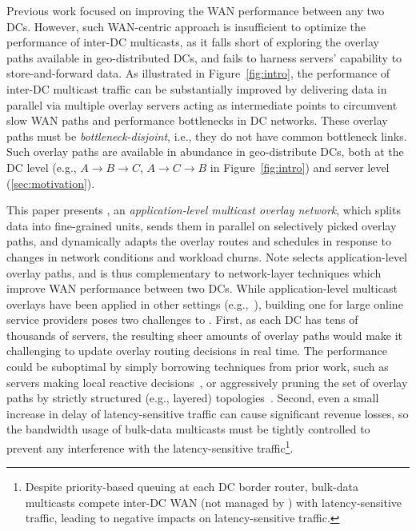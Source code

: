 Previous work focused on improving the WAN performance between any
two DCs.
However, such WAN-centric approach is insufficient to optimize the
performance of inter-DC multicasts, as it falls short of exploring
the overlay paths available in geo-distributed DCs, and
fails to harness servers' capability to store-and-forward data.
As illustrated in Figure~\ref{fig:intro}, the performance of
inter-DC multicast traffic can be substantially improved by
delivering data in parallel via multiple overlay  servers
acting as intermediate points to circumvent slow WAN paths and
performance bottlenecks in DC networks.
These overlay paths must be {\em bottleneck-disjoint}, i.e., they do
not have common bottleneck links.
Such overlay paths are available in abundance in
geo-distribute DCs, both at the
DC level (e.g., $A$$\rightarrow$$B$$\rightarrow$$C$,
$A$$\rightarrow$$C$$\rightarrow$$B$ in Figure~\ref{fig:intro})
and server level (\Section\ref{sec:motivation}).




This paper presents {\em \name}, an {\em application-level
multicast overlay network}, which
\name splits data into fine-grained
units, sends them in parallel on selectively picked
overlay paths, and dynamically adapts the overlay routes and
schedules in response to changes in network conditions and
workload churns.
Note \name selects application-level overlay paths, and is thus
complementary to network-layer techniques which
improve WAN performance between two DCs.
While application-level multicast overlays have been applied
in other settings
(e.g.,~\cite{Liebeherr2002Application,Wang2007mTreebone,
Andreev2013Designing,Mokhtarian2015Minimum}), building one
for large online service providers poses two
challenges to \name.
First, as each DC has tens of thousands of servers, the
resulting sheer amounts of overlay paths would make it
challenging to update overlay routing decisions in real time.
The performance could be suboptimal by simply borrowing techniques
from prior work, such as servers making local reactive
decisions~\cite{kostic2003bullet,Repantis2010Scaling,Huang2014A},
or aggressively pruning the set of overlay paths by strictly
structured (e.g., layered) topologies~\cite{Nygren2010The}.
Second, even a small increase in delay of latency-sensitive traffic
can cause significant revenue losses, so the bandwidth usage
of bulk-data multicasts must be tightly controlled
to prevent any interference with the latency-sensitive
traffic\footnote{Despite priority-based queuing
at each DC border router, bulk-data multicasts compete
inter-DC WAN (not managed by \company) with
latency-sensitive traffic, leading to negative impacts on
latency-sensitive traffic.}.

